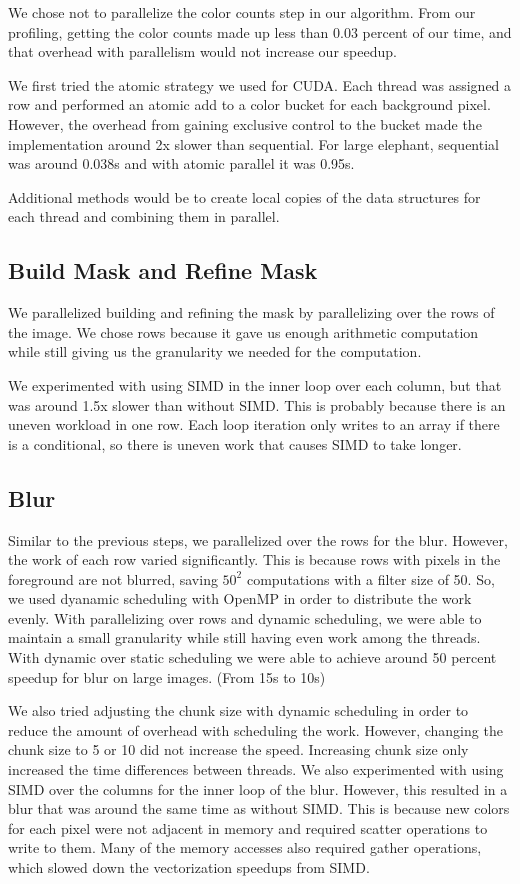 \documentclass[12pt]{article}
\begin{document}
We chose not to parallelize the color counts step in our algorithm. From our
profiling, getting the color counts made up less than 0.03 percent of our time,
and that overhead with parallelism would not increase our speedup.

We first tried the atomic strategy we used for CUDA. Each thread was assigned a
row and performed an atomic add to a color bucket for each background pixel.
However, the overhead from gaining exclusive control to the bucket made the
implementation around 2x slower than sequential. For large elephant, sequential
was around 0.038s and with atomic parallel it was 0.95s.

Additional methods would be to create local copies of the data structures for
each thread and combining them in parallel.

\subsection{Build Mask and Refine Mask}

We parallelized building and refining the mask by parallelizing over the rows
of the image. We chose rows because it gave us enough arithmetic computation
while still giving us the granularity we needed for the computation.

We experimented with using SIMD in the inner loop over each column, but that
was around 1.5x slower than without SIMD. This is probably because there is an
uneven workload in one row. Each loop iteration only writes to an array if
there is a conditional, so there is uneven work that causes SIMD to take
longer.

\subsection{Blur}

Similar to the previous steps, we parallelized over the rows for the blur.
However, the work of each row varied significantly. This is because rows with
pixels in the foreground are not blurred, saving $50^2$ computations with a
filter size of 50. So, we used dyanamic scheduling with OpenMP in order to
distribute the work evenly. With parallelizing over rows and dynamic
scheduling, we were able to maintain a small granularity while still having
even work among the threads. With dynamic over static scheduling we were able
to achieve around 50 percent speedup for blur on large images. (From 15s to
10s)

We also tried adjusting the chunk size with dynamic scheduling in order to
reduce the amount of overhead with scheduling the work. However, changing the
chunk size to 5 or 10 did not increase the speed. Increasing chunk size only
increased the time differences between threads. We also experimented with using
SIMD over the columns for the inner loop of the blur. However, this resulted in
a blur that was around the same time as without SIMD. This is because new
colors for each pixel were not adjacent in memory and required scatter
operations to write to them. Many of the memory accesses also required gather
operations, which slowed down the vectorization speedups from SIMD.
\end{document}
